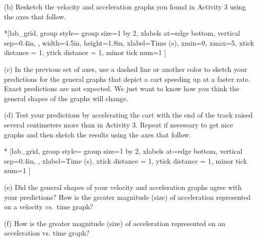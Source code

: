 (b) Resketch the velocity and acceleration graphs you found in Activity 3 using
the axes that follow.


\begin{lab_groupplot}*{}[lab_grid,
	group style={
		group size=1 by 2,
		xlabels at=edge bottom,
		vertical sep=0.4in,
		},
	width=4.5in,  height=1.8in,
	xlabel=Time (s),
	xmin=0, xmax=5,
	xtick distance = 1, 
	ytick distance = 1, 
	minor tick num=1
	]
\nextgroupplot[
	ymin=-1,ymax=1, 
	ylabel={Velocity (m/s)},
	]
\nextgroupplot[
	ymin=-1,ymax=1, 
	ylabel={Acceleration (m/s$^2$)},
	]
\end{lab_groupplot}

(c) In the previous set of axes, use a dashed line or another color to sketch
your predictions for the general graphs that depict a cart speeding up at a
faster rate. Exact predictions are not expected. We just want to know how you
think the general shapes of the graphs will change.

\pagebreak[2]
(d) Test your predictions by accelerating the cart with the end of the track raised several centimeters more than in Activity 3. Repeat if necessary to get nice graphs and then sketch the results using the axes that follow.

\begin{lab_groupplot}*{}
					[lab_grid,
	group style={
		group size=1 by 2,
		xlabels at=edge bottom,
		vertical sep=0.4in,
		},
	xlabel=Time (s),
	xtick distance = 1, 
	ytick distance = 1, 
	minor tick num=1
	]
\nextgroupplot[
	ylabel={Velocity (m/s)},
	]
\nextgroupplot[
	ylabel={Acceleration (m/s$^2$)},
	]
\end{lab_groupplot}

(e) Did the general shapes of your velocity and acceleration graphs agree with
your predictions? How is the greater magnitude (size) of acceleration represented
on a velocity \textit{vs.}~time graph? 
\answerspace{25mm}

(f) How is the greater magnitude (size) of acceleration represented on an acceleration
vs. time graph? 
\answerspace{25mm}

